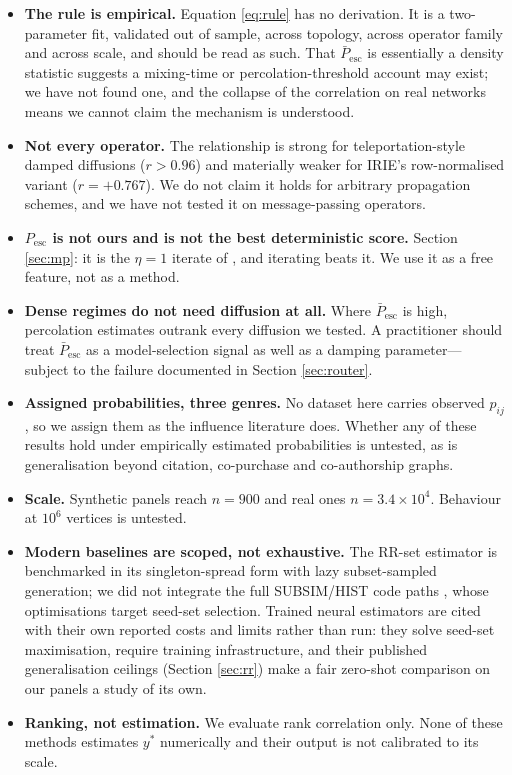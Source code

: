 \documentclass[11pt,a4paper]{article}
\newcommand{\Pesc}{P_{\mathrm{esc}}}
\newcommand{\Pescbar}{\bar{P}_{\mathrm{esc}}}
\begin{document}
\begin{itemize}[leftmargin=1.4em,itemsep=3pt]
\item \textbf{The rule is empirical.} Equation \eqref{eq:rule} has no
derivation. It is a two-parameter fit, validated out of sample, across topology,
across operator family and across scale, and should be read as such. That
$\Pescbar$ is essentially a density statistic suggests a mixing-time or
percolation-threshold account may exist; we have not found one, and the collapse
of the correlation on real networks means we cannot claim the mechanism is
understood.
\item \textbf{Not every operator.} The relationship is strong for
teleportation-style damped diffusions ($r>0.96$) and materially weaker for
IRIE's row-normalised variant ($r=+0.767$). We do not claim it holds for
arbitrary propagation schemes, and we have not tested it on message-passing
operators.
\item \textbf{$\Pesc$ is not ours and is not the best deterministic score.}
Section \ref{sec:mp}: it is the $\eta=1$ iterate of \cite{knz14}, and iterating
beats it. We use it as a free feature, not as a method.
\item \textbf{Dense regimes do not need diffusion at all.} Where $\Pescbar$ is
high, percolation estimates outrank every diffusion we tested. A practitioner
should treat $\Pescbar$ as a model-selection signal as well as a damping
parameter---subject to the failure documented in Section \ref{sec:router}.
\item \textbf{Assigned probabilities, three genres.} No dataset here carries
observed $p_{ij}$, so we assign them as the influence literature does. Whether
any of these results hold under empirically estimated probabilities is untested,
as is generalisation beyond citation, co-purchase and co-authorship graphs.
\item \textbf{Scale.} Synthetic panels reach $n=900$ and real ones
$n=3.4\times10^4$. Behaviour at $10^6$ vertices is untested.
\item \textbf{Modern baselines are scoped, not exhaustive.} The RR-set
estimator is benchmarked in its singleton-spread form with lazy
subset-sampled generation; we did not integrate the full SUBSIM/HIST code
paths \cite{guo20,guo22}, whose optimisations target seed-set selection.
Trained neural estimators \cite{deepis21,glie23,ling23,touplegdd24,piano23}
are cited with their own reported costs and limits rather than run: they
solve seed-set maximisation, require training infrastructure, and their
published generalisation ceilings (Section \ref{sec:rr}) make a fair
zero-shot comparison on our panels a study of its own.
\item \textbf{Ranking, not estimation.} We evaluate rank correlation only. None
of these methods estimates $y^*$ numerically and their output is not calibrated
to its scale.
\end{itemize}
\end{document}
